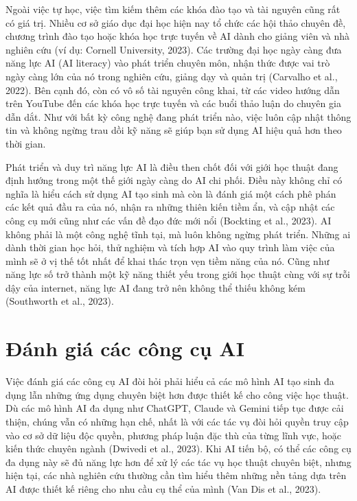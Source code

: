 Ngoài việc tự học, việc tìm kiếm thêm các khóa đào tạo và tài nguyên cũng rất có giá trị. Nhiều cơ sở giáo dục đại học hiện nay tổ chức các hội thảo chuyên đề, chương trình đào tạo hoặc khóa học trực tuyến về AI dành cho giảng viên và nhà nghiên cứu (ví dụ: Cornell University, 2023). Các trường đại học ngày càng đưa năng lực AI (AI literacy) vào phát triển chuyên môn, nhận thức được vai trò ngày càng lớn của nó trong nghiên cứu, giảng dạy và quản trị (Carvalho et al., 2022). Bên cạnh đó, còn có vô số tài nguyên công khai, từ các video hướng dẫn trên YouTube đến các khóa học trực tuyến và các buổi thảo luận do chuyên gia dẫn dắt. Như với bất kỳ công nghệ đang phát triển nào, việc luôn cập nhật thông tin và không ngừng trau dồi kỹ năng sẽ giúp bạn sử dụng AI hiệu quả hơn theo thời gian.

Phát triển và duy trì năng lực AI là điều then chốt đối với giới học thuật đang định hướng trong một thế giới ngày càng do AI chi phối. Điều này không chỉ có nghĩa là hiểu cách sử dụng AI tạo sinh mà còn là đánh giá một cách phê phán các kết quả đầu ra của nó, nhận ra những thiên kiến tiềm ẩn, và cập nhật các công cụ mới cũng như các vấn đề đạo đức mới nổi (Bockting et al., 2023). AI không phải là một công nghệ tĩnh tại, mà luôn không ngừng phát triển. Những ai dành thời gian học hỏi, thử nghiệm và tích hợp AI vào quy trình làm việc của mình sẽ ở vị thế tốt nhất để khai thác trọn vẹn tiềm năng của nó. Cũng như năng lực số trở thành một kỹ năng thiết yếu trong giới học thuật cùng với sự trỗi dậy của internet, năng lực AI đang trở nên không thể thiếu không kém (Southworth et al., 2023).

\section{Đánh giá các công cụ AI}

Việc đánh giá các công cụ AI đòi hỏi phải hiểu cả các mô hình AI tạo sinh đa dụng lẫn những ứng dụng chuyên biệt hơn được thiết kế cho công việc học thuật. Dù các mô hình AI đa dụng như ChatGPT, Claude và Gemini tiếp tục được cải thiện, chúng vẫn có những hạn chế, nhất là với các tác vụ đòi hỏi quyền truy cập vào cơ sở dữ liệu độc quyền, phương pháp luận đặc thù của từng lĩnh vực, hoặc kiến thức chuyên ngành (Dwivedi et al., 2023). Khi AI tiến bộ, có thể các công cụ đa dụng này sẽ đủ năng lực hơn để xử lý các tác vụ học thuật chuyên biệt, nhưng hiện tại, các nhà nghiên cứu thường cần tìm hiểu thêm những nền tảng dựa trên AI được thiết kế riêng cho nhu cầu cụ thể của mình (Van Dis et al., 2023).

